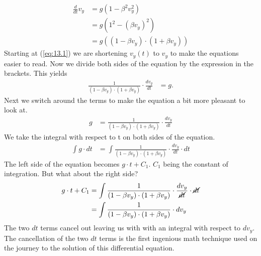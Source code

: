 \documentclass[paper=a4, fontsize=11pt]{scrartcl} %
\numberwithin{equation}{section} %
\numberwithin{figure}{section} %
\numberwithin{table}{section} %
\begin{document}
\begin{align} \label{eq:13.1}
\frac{d}{dt} v_y &= g \left(1 - \beta^2 v_y^2\right) \\
                    &= g \left(1^2 - (\beta v_y)^2\right) \\
                    &= g \left((1 - \beta v_y)\cdot (1 + \beta v_y)\right)
\end{align}
Starting at (\ref{eq:13.1}) we are shortening $v_y(t)$ to $v_y$ to make the equations easier to read. Now we divide both sides of the equation by the expression in the brackets. This yields
\begin{align} \label{eq:13.2}
\frac{1}{(1 - \beta v_y)\cdot (1 + \beta v_y)} \cdot \frac{d v_y}{dt}  &= g.
\end{align}
Next we switch around the terms to make the equation a bit more pleasant to look at.
\begin{align} \label{eq:14}
g  &= \frac{1}{(1 - \beta v_y)\cdot (1 + \beta v_y)} \cdot \frac{d v_y}{dt}
\end{align}
We take the integral with respect to t on both sides of the equation.
\begin{align} \label{eq:15}
\int g \cdot dt &= \int \frac{1}{(1 - \beta v_y)\cdot (1 + \beta v_y)} \cdot \frac{d v_y}{dt} \cdot dt
\end{align}
The left side of the equation becomes $g \cdot t + C_1$. $C_1$ being the constant of integration.
But what about the right side?
\begin{align} 
g \cdot t + C_1 &= \int \frac{1}{(1 - \beta v_y)\cdot (1 + \beta v_y)} \cdot \frac{d v_y}{\cancel{dt}} \cdot \cancel{dt} \label{eq:16}\\
                &= \int \frac{1}{(1 - \beta v_y)\cdot (1 + \beta v_y)} \cdot d v_y \label{eq:17}
\end{align}
The two $dt$ terms cancel out leaving us with with an integral with respect to $dv_y$.
The cancellation of the two $dt$ terms is the first ingenious math technique used on the journey to the solution of this differential equation.
\vspace{\baselineskip}
\end{document}
